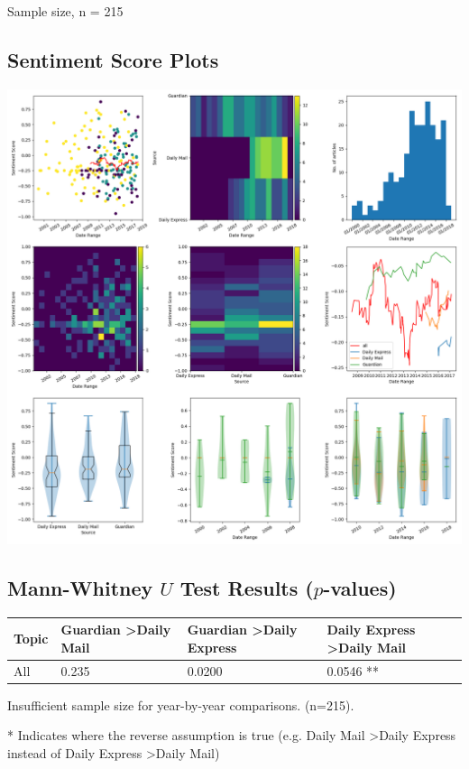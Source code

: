 \documentclass{report}
\begin{document}
\noindent Sample size, n = 215

\subsection{Sentiment Score Plots}
\includegraphics[width=\textwidth]{raw/speech-impairment.png}

\subsection{Mann-Whitney $U$ Test Results ($p$-values)}
\noindent
\begin{tabu} to \textwidth { | X[c] | X[c] | X[c] | X[c] | }
	\hline
	Topic & Guardian \textgreater\space Daily Mail & Guardian \textgreater\space Daily Express & Daily Express \textgreater\space Daily Mail  \\
	\hline
	All & 0.235 & 0.0200 & 0.0546 **  \\
	\hline
\end{tabu}

\noindent Insufficient sample size for year-by-year comparisons. (n=215).

\noindent ** Indicates where the reverse assumption is true (e.g. Daily Mail \textgreater\space Daily Express instead of Daily Express \textgreater\space Daily Mail)
\end{document}
